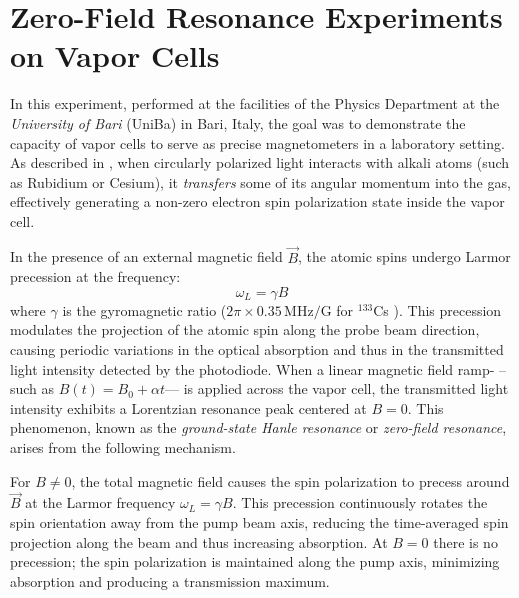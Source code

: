 \FloatBarrier
\section{Zero-Field Resonance Experiments on Vapor Cells} 
\label{sec:zfrexp}
 In this experiment, performed at the facilities of the Physics  
 Department at the \textit{University of Bari} (UniBa) in Bari,  
 Italy, the goal was to demonstrate the capacity of vapor cells to  
 serve as precise magnetometers in a laboratory setting. As described  
 in \cite{lucivero2022, tierney2019}, when circularly polarized light  
 interacts with alkali atoms (such as Rubidium or Cesium), it  
 \textit{transfers} some of its angular momentum into the gas,  
 effectively generating a non-zero electron spin polarization state  
 inside the vapor cell. 

 In the presence of an external magnetic field $\vec{B}$, the atomic  
 spins undergo Larmor precession at the frequency: 
 \begin{equation} 
     \omega_L = \gamma B 
 \end{equation} 
 where $\gamma$ is the gyromagnetic ratio  
 ($2\pi \times 0.35\,\mathrm{MHz/G}$ for $^{133}$Cs \cite{gyrocs}). This precession  
 modulates the projection of the atomic spin along the probe beam  
 direction, causing periodic variations in the optical absorption and  
 thus in the transmitted light intensity detected by the photodiode.  
 When a linear magnetic field ramp- --such as  
 $B(t) = B_0 + \alpha t$--- is applied across the vapor cell, the  
 transmitted light intensity exhibits a Lorentzian resonance peak  
 centered at $B = 0$. This phenomenon, known as the  
 \textit{ground-state Hanle resonance} or \textit{zero-field  
 resonance}, arises from the following mechanism. 

 For $B \neq 0$, the total magnetic field causes the spin  
 polarization to precess around $\vec{B}$ at the Larmor frequency  
 $\omega_L = \gamma B$. This precession continuously rotates the  
 spin orientation away from the pump beam axis, reducing the  
 time-averaged spin projection along the beam and thus increasing  
 absorption. At $B = 0$ there is no precession; the spin  
 polarization is maintained along the pump axis, minimizing  
 absorption and producing a transmission maximum. 

